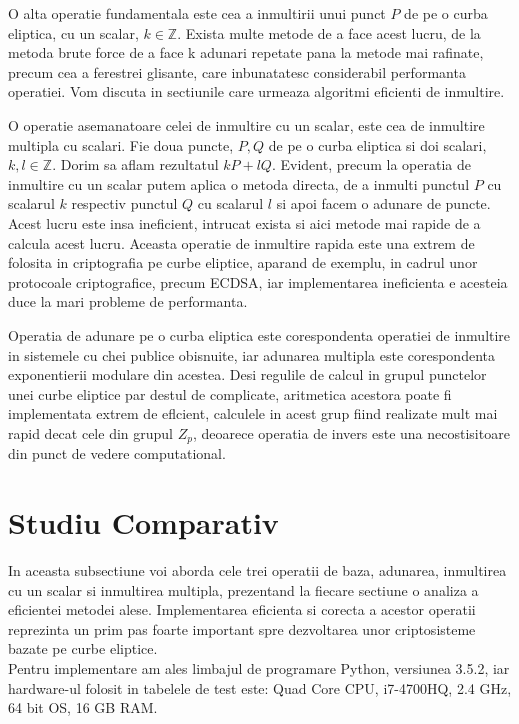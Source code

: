 \begin{dfn}
O alta operatie fundamentala este cea a inmultirii unui punct $P$ de pe o curba eliptica, cu un scalar, $k\in \mathbb{Z}$. Exista multe metode de a face acest lucru, de la metoda brute force de a face k adunari repetate pana la metode mai rafinate, precum cea a ferestrei glisante, care inbunatatesc considerabil performanta operatiei. Vom discuta in sectiunile care urmeaza algoritmi eficienti de inmultire. 
\end{dfn}

\begin{dfn}
O operatie asemanatoare celei de inmultire cu un scalar, este cea de inmultire multipla cu scalari. Fie doua puncte, $P, Q$ de pe o curba eliptica si doi scalari, $k, l\in \mathbb{Z}$. Dorim sa aflam rezultatul $kP + lQ$. Evident, precum la operatia de inmultire cu un scalar putem aplica o metoda directa, de a inmulti punctul $P$ cu scalarul $k$ respectiv punctul $Q$ cu scalarul $l$ si apoi facem o adunare de puncte. Acest lucru este insa ineficient, intrucat exista si aici metode mai rapide de a calcula acest lucru. Aceasta operatie de inmultire rapida este una extrem de folosita in criptografia pe curbe eliptice, aparand de exemplu, in cadrul unor protocoale criptografice, precum ECDSA, iar implementarea ineficienta e acesteia duce la mari probleme de performanta. 
\end{dfn}

\begin{obs}
Operatia de adunare pe o curba eliptica este corespondenta operatiei de inmultire
in sistemele cu chei publice obisnuite, iar adunarea multipla este corespondenta
exponentierii modulare din acestea.
Desi regulile de calcul in grupul punctelor unei curbe eliptice par destul de complicate, aritmetica acestora poate fi implementata extrem de eflcient, calculele in acest grup fiind realizate mult mai rapid decat cele din grupul $Z_p$, deoarece operatia de invers este una necostisitoare din punct de vedere computational.
\end{obs}

\section{Studiu Comparativ}
\label{sec:sec03}
In aceasta subsectiune voi aborda cele trei operatii de baza, adunarea, inmultirea cu un scalar si inmultirea multipla, prezentand la fiecare sectiune o analiza a eficientei metodei alese. Implementarea eficienta si corecta a acestor operatii reprezinta un prim pas foarte important spre dezvoltarea unor criptosisteme bazate pe curbe eliptice.
\\ Pentru implementare am ales limbajul de programare Python, versiunea 3.5.2, iar hardware-ul folosit in tabelele de test este: Quad Core CPU, i7-4700HQ, 2.4 GHz, 64 bit OS, 16 GB RAM.

